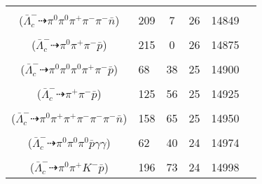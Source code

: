 \documentclass[landscape]{article}
\newcounter{rownumbers}
\newcommand\rn{\stepcounter{rownumbers}\arabic{rownumbers}}
\newcommand{\EOL}{\\} %
\newcommand{\topoTags}[1]{#1} %
\begin{document}
\begin{longtable}{clcccc}
\rn & \makecell[l]{ $ 
\bar{\Lambda}_{c}^{-} \rightarrow \pi^{-} \eta \bar{\Lambda} ,
\eta \rightarrow \pi^{0} \pi^{+} \pi^{-} ,
\bar{\Lambda} \rightarrow \pi^{0} \bar{n} 
$ \\ ($
\bar{\Lambda}_{c}^{-} \dashrightarrow \pi^{0} \pi^{0} \pi^{+} \pi^{-} \pi^{-} \bar{n} 
$) } & \topoTags{209 & 7 & }26 & 14849 \EOL

\rn & \makecell[l]{ $ 
\bar{\Lambda}_{c}^{-} \rightarrow \omega \bar{p} ,
\omega \rightarrow \pi^{0} \pi^{+} \pi^{-} 
$ \\ ($
\bar{\Lambda}_{c}^{-} \dashrightarrow \pi^{0} \pi^{+} \pi^{-} \bar{p} 
$) } & \topoTags{215 & 0 & }26 & 14875 \EOL

\rn & \makecell[l]{ $ 
\bar{\Lambda}_{c}^{-} \rightarrow \eta K^{0} \bar{p} ,
\eta \rightarrow \pi^{0} \pi^{+} \pi^{-} ,
K^{0} \rightarrow K_{S}^{0} ,
K_{S}^{0} \rightarrow \pi^{0} \pi^{0} 
$ \\ ($
\bar{\Lambda}_{c}^{-} \dashrightarrow \pi^{0} \pi^{0} \pi^{0} \pi^{+} \pi^{-} \bar{p} 
$) } & \topoTags{68 & 38 & }25 & 14900 \EOL

\rn & \makecell[l]{ $ 
\bar{\Lambda}_{c}^{-} \rightarrow \pi^{+} \pi^{-} \bar{p} 
$ \\ ($
\bar{\Lambda}_{c}^{-} \dashrightarrow \pi^{+} \pi^{-} \bar{p} 
$) } & \topoTags{125 & 56 & }25 & 14925 \EOL

\rn & \makecell[l]{ $ 
\bar{\Lambda}_{c}^{-} \rightarrow \pi^{-} \pi^{-} \eta \bar{\Sigma}^{+} ,
\eta \rightarrow \pi^{0} \pi^{+} \pi^{-} ,
\bar{\Sigma}^{+} \rightarrow \pi^{+} \bar{n} 
$ \\ ($
\bar{\Lambda}_{c}^{-} \dashrightarrow \pi^{0} \pi^{+} \pi^{+} \pi^{-} \pi^{-} \pi^{-} \bar{n} 
$) } & \topoTags{158 & 65 & }25 & 14950 \EOL

\rn & \makecell[l]{ $ 
\bar{\Lambda}_{c}^{-} \rightarrow \eta^{\prime} \bar{\Sigma}^{-} ,
\eta^{\prime} \rightarrow \pi^{0} \pi^{0} \eta ,
\bar{\Sigma}^{-} \rightarrow \pi^{0} \bar{p} ,
\eta \rightarrow \gamma \gamma 
$ \\ ($
\bar{\Lambda}_{c}^{-} \dashrightarrow \pi^{0} \pi^{0} \pi^{0} \bar{p} \gamma \gamma 
$) } & \topoTags{62 & 40 & }24 & 14974 \EOL

\rn & \makecell[l]{ $ 
\bar{\Lambda}_{c}^{-} \rightarrow K^{-} \bar{\Xi}^{0} ,
\bar{\Xi}^{0} \rightarrow \pi^{0} \bar{\Lambda} ,
\bar{\Lambda} \rightarrow \pi^{+} \bar{p} 
$ \\ ($
\bar{\Lambda}_{c}^{-} \dashrightarrow \pi^{0} \pi^{+} K^{-} \bar{p} 
$) } & \topoTags{196 & 73 & }24 & 14998 \EOL


\end{longtable}
\end{document}
